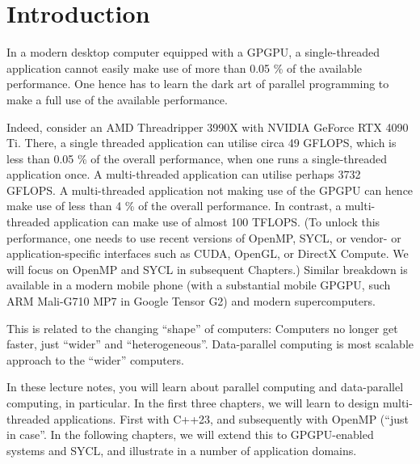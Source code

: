 \chapter{Introduction}

In a modern desktop computer equipped with a GPGPU, a single-threaded application cannot easily make use of more than 0.05 \% of the available performance. One hence has to learn the dark art of parallel programming to make a full use of the available performance.  

Indeed, consider an AMD Threadripper 3990X with NVIDIA GeForce RTX 4090 Ti. There, a single threaded application can utilise circa 49 GFLOPS, which is less than 0.05 \% of the overall performance, when one runs a single-threaded application once.
A multi-threaded application can utilise perhaps 3732 GFLOPS. A multi-threaded application not making use of the GPGPU can hence make use of less than 4 \%  of the overall performance. 
In contrast, a multi-threaded application can make use of almost 100 TFLOPS.
(To unlock this performance, one needs to use recent versions of OpenMP, SYCL, or vendor- or application-specific interfaces such as CUDA, OpenGL, or DirectX Compute. We will focus on OpenMP and SYCL in subsequent Chapters.)
Similar breakdown is available in a modern mobile phone (with a substantial mobile GPGPU, such ARM Mali-G710 MP7 in Google Tensor G2) and modern supercomputers.

This is related to the changing ``shape'' of computers: Computers no longer get faster, just ``wider'' and ``heterogeneous''. Data-parallel computing is most scalable approach to the ``wider'' computers.
  
In these lecture notes, you will learn about parallel computing and data-parallel computing, in particular. 
In the first three chapters, we will learn to design multi-threaded applications. First with C++23, and subsequently with OpenMP (``just in case''. In the following chapters, we will extend this to GPGPU-enabled systems and SYCL, and illustrate in a number of application domains.  

